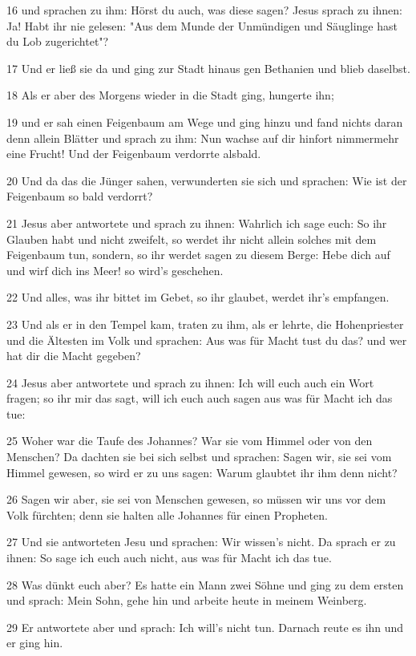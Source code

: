 \par 16 und sprachen zu ihm: Hörst du auch, was diese sagen? Jesus sprach zu ihnen: Ja! Habt ihr nie gelesen: "Aus dem Munde der Unmündigen und Säuglinge hast du Lob zugerichtet"?
\par 17 Und er ließ sie da und ging zur Stadt hinaus gen Bethanien und blieb daselbst.
\par 18 Als er aber des Morgens wieder in die Stadt ging, hungerte ihn;
\par 19 und er sah einen Feigenbaum am Wege und ging hinzu und fand nichts daran denn allein Blätter und sprach zu ihm: Nun wachse auf dir hinfort nimmermehr eine Frucht! Und der Feigenbaum verdorrte alsbald.
\par 20 Und da das die Jünger sahen, verwunderten sie sich und sprachen: Wie ist der Feigenbaum so bald verdorrt?
\par 21 Jesus aber antwortete und sprach zu ihnen: Wahrlich ich sage euch: So ihr Glauben habt und nicht zweifelt, so werdet ihr nicht allein solches mit dem Feigenbaum tun, sondern, so ihr werdet sagen zu diesem Berge: Hebe dich auf und wirf dich ins Meer! so wird's geschehen.
\par 22 Und alles, was ihr bittet im Gebet, so ihr glaubet, werdet ihr's empfangen.
\par 23 Und als er in den Tempel kam, traten zu ihm, als er lehrte, die Hohenpriester und die Ältesten im Volk und sprachen: Aus was für Macht tust du das? und wer hat dir die Macht gegeben?
\par 24 Jesus aber antwortete und sprach zu ihnen: Ich will euch auch ein Wort fragen; so ihr mir das sagt, will ich euch auch sagen aus was für Macht ich das tue:
\par 25 Woher war die Taufe des Johannes? War sie vom Himmel oder von den Menschen? Da dachten sie bei sich selbst und sprachen: Sagen wir, sie sei vom Himmel gewesen, so wird er zu uns sagen: Warum glaubtet ihr ihm denn nicht?
\par 26 Sagen wir aber, sie sei von Menschen gewesen, so müssen wir uns vor dem Volk fürchten; denn sie halten alle Johannes für einen Propheten.
\par 27 Und sie antworteten Jesu und sprachen: Wir wissen's nicht. Da sprach er zu ihnen: So sage ich euch auch nicht, aus was für Macht ich das tue.
\par 28 Was dünkt euch aber? Es hatte ein Mann zwei Söhne und ging zu dem ersten und sprach: Mein Sohn, gehe hin und arbeite heute in meinem Weinberg.
\par 29 Er antwortete aber und sprach: Ich will's nicht tun. Darnach reute es ihn und er ging hin.
